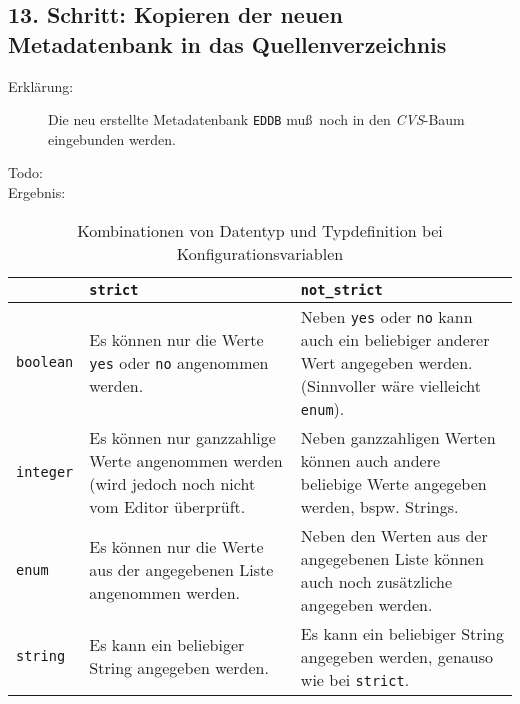 \documentclass[pdftex,titlepage,10pt]{article}
\begin{document}
\subsection*{13. Schritt: Kopieren der neuen Metadatenbank in das Quellenverzeichnis}
\begin{description}
\item[Erkl\"arung:] Die neu erstellte Metadatenbank {\tt EDDB} mu\ss \ noch
  in den {\em CVS}-Baum eingebunden werden.
\item[Todo:]
\item[Ergebnis:]
\end{description}

\begin{table}
\begin{center}\label{tabelle}
  \begin{tabular}{|l|p{5.5cm}|p{5.5cm}|}
    \hline
    & {\tt strict} & {\tt not\_strict}\\
    \hline
    {\tt boolean} & Es k\"onnen nur die Werte {\tt yes} oder {\tt no}
    angenommen werden. & Neben {\tt yes} oder {\tt no} kann auch ein
    beliebiger anderer Wert angegeben werden. (Sinnvoller w\"are
    vielleicht {\tt enum}).\\[.5em]
    {\tt integer} & Es k\"onnen nur ganzzahlige Werte angenommen werden
    (wird jedoch noch nicht vom Editor \"uberpr\"uft. & Neben ganzzahligen
    Werten k\"onnen auch andere beliebige Werte angegeben werden, bspw.
    Strings.\\[.5em]
    {\tt enum }   & Es k\"onnen nur die Werte aus der angegebenen Liste
    angenommen werden. & Neben den Werten aus der angegebenen Liste
    k\"onnen auch noch zus\"atzliche angegeben werden.\\[.5em]
    {\tt string}  & Es kann ein beliebiger String angegeben werden. &
    Es kann ein beliebiger String angegeben werden, genauso wie bei
    {\tt strict}.\\
    \hline
  \end{tabular}
\caption{Kombinationen von Datentyp und Typdefinition bei Konfigurationsvariablen}
\end{center}
\end{table}
\end{document}
